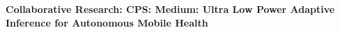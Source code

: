 \documentclass[10pt]{SelfArx}
\begin{document}
\selectfont













\clearpage


\begin{center}
{\bf \large 
Collaborative Research: CPS: Medium: Ultra Low Power Adaptive Inference for Autonomous Mobile Health 
}
\end{center}



\setcounter{page}{1}








%

%
%
%




\newpage

%


%




\end{document}
